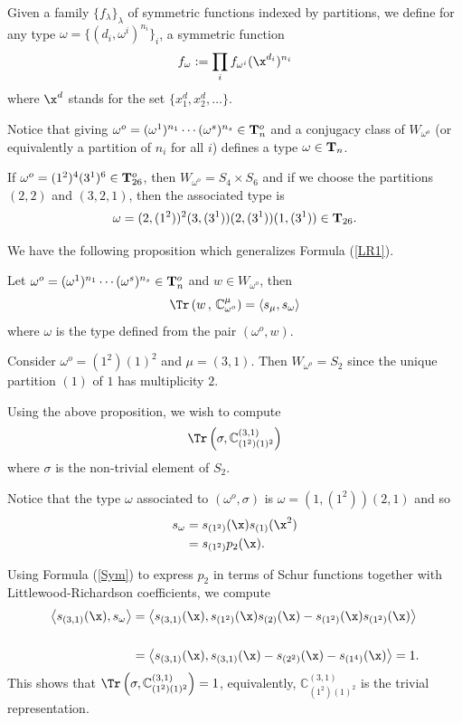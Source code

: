 Given a family $\{f_\lambda\}_\lambda$ of symmetric functions indexed by partitions, we define for any type $\omega=\{(d_i,\omega^i)^{n_i}\}_i$, a symmetric function
$$
f_\omega:=\prod_if_{\omega^i}(\x^{d_i})^{n_i}
$$
where $\x^d$ stands for the set $\{x_1^d,x_2^d,\dots\}$.


Notice that giving $\omega^o=(\omega^1)^{n_1}\cdots(\omega^s)^{n_s}\in{\bf T}^o_n$ and a conjugacy class of $W_{\omega^o}$ (or equivalently a partition of $n_i$ for all $i$) defines a type $\omega\in{\bf T}_n$.


\begin{exam} If $\omega^o=(1^2)^4(3^1)^6\in{\bf T}^o_{26}$, then $W_{\omega^o}=S_4\times S_6$ and if we choose the partitions $(2,2)$ and $(3,2,1)$, then the associated type is
	$$
	\omega=(2,(1^2))^2(3,(3^1))(2,(3^1))(1,(3^1))\in{\bf T}_{26}.
	$$
\end{exam}

We have the following proposition which generalizes Formula (\ref{LR1}).

\begin{prop}\cite[Proposition 6.2.5]{L2} Let $\omega^o=(\omega^1)^{n_1}\cdots(\omega^s)^{n_s}\in{\bf T}^o_n$ and $w\in W_{\omega^o}$, then
	$$
	\Tr\left(w\,,\, \mathbb{C}_{\omega^o}^\mu\right)=\left\langle s_\mu, s_\omega\right\rangle
	$$
	where $\omega$ is the type defined from the pair $(\omega^o,w)$.
	\label{Prop13}\end{prop}


\begin{exam}\label{ex} Consider $\omega^o=(1^2)(1)^2$ and $\mu=(3,1)$.  Then $W_{\omega^o}=S_2$ since the unique partition  $(1)$ of $1$ has multiplicity $2$.  
	
	Using the above proposition, we wish to compute
	$$
	\Tr\left(\sigma, \mathbb{C}^{(3,1)}_{(1^2)(1)^2}\right)
	$$
	where $\sigma$ is the non-trivial element of $S_2$. 
	
	
	Notice that the type $\omega$ associated to $(\omega^o,\sigma)$ is $\omega=(1,(1^2))(2,1)$ and so
	\begin{align*}
		s_\omega&=s_{(1^2)}(\x)s_{(1)}(\x^2)\\
		&=s_{(1^2)}p_2(\x).
	\end{align*}
	
	Using Formula (\ref{Sym}) to express $p_2$ in terms of Schur functions together with Littlewood-Richardson coefficients, we compute 
	\begin{align*}
		\left\langle s_{(3,1)}(\x),s_\omega\right\rangle&=\left\langle s_{(3,1)}(\x),s_{(1^2)}(\x)s_{(2)}(\x)-s_{(1^2)}(\x)s_{(1^2)}(\x) \right\rangle\\
		\\
		&= \left\langle s_{(3,1)}(\x),s_{(3,1)}(\x)-s_{(2^2)}(\x)-s_{(1^4)}(\x)\right\rangle=1.
	\end{align*}
	This shows that $\Tr\left(\sigma, \mathbb{C}^{(3,1)}_{(1^2)(1)^2}\right)=1$, equivalently,  $\mathbb{C}^{(3,1)}_{(1^2)(1)^2}$ is the trivial representation.
	
	
\end{exam}

